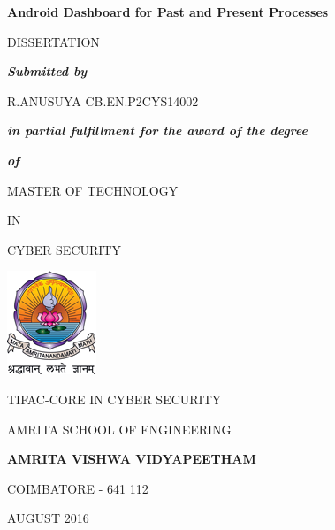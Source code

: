 \documentclass[12pt]{report}
\author{Anusuya}
\date{July 2016}
\begin{document}





\begin{center}
	\Large
	\textbf{Android Dashboard for Past and Present Processes}
	
	\vspace*{32pt}
	\normalsize
	DISSERTATION
	
	\vspace*{32pt}
	\textbf{\textit{Submitted by}}
	
	\vspace*{32pt}
	\begin{flushleft}
		\hspace*{100pt}
		\large                             
		R.ANUSUYA
		\hspace*{2pt}
		\large
		CB.EN.P2CYS14002
	\end{flushleft}
	
	\vspace*{32pt}
	\normalsize
	\textit{\textbf{in partial fulfillment for the award of the degree}}
	
	\textbf{\textit{of}}
	
	\vspace*{32pt}
	MASTER OF TECHNOLOGY
	
	IN
	
	CYBER SECURITY
	
	\vspace*{32pt}
	\includegraphics[keepaspectratio=true]{avvp_logo1}
	
	\vspace*{20pt}
	\normalsize
	TIFAC-CORE IN CYBER SECURITY
	
	\vspace*{5pt}
	AMRITA SCHOOL OF ENGINEERING
	
	\vspace*{5pt}
	\large
	\textbf{AMRITA VISHWA VIDYAPEETHAM}
	
	\vspace*{5pt}
	\normalsize
	COIMBATORE - 641 112
	
	\vspace*{10pt}
	AUGUST 2016
\end{center}
\end{document}
